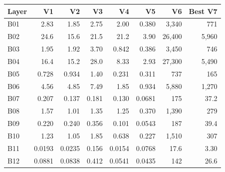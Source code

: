 \begin{tabular}{lrrrrrrr}
\hline
\rowcolor{headgrey}
\textbf{Layer} & \textbf{V1} & \textbf{V2} & \textbf{V3} & \textbf{V4} & \textbf{V5} & \textbf{V6} & \textbf{Best V7} \\ \hline
B01 & 2.83 & 1.85 & 2.75 & 2.00 & 0.380 & 3{,}340 & 771 \\
B02 & 24.6 & 15.6 & 21.5 & 21.2 & 3.90 & 26{,}400 & 5{,}960 \\
B03 & 1.95 & 1.92 & 3.70 & 0.842 & 0.386 & 3{,}450 & 746 \\
B04 & 16.4 & 15.2 & 28.0 & 8.33 & 2.93 & 27{,}300 & 5{,}490 \\
B05 & 0.728 & 0.934 & 1.40 & 0.231 & 0.311 & 737 & 165 \\
B06 & 4.56 & 4.85 & 7.49 & 1.85 & 0.934 & 5{,}880 & 1{,}270 \\
B07 & 0.207 & 0.137 & 0.181 & 0.130 & 0.0681 & 175 & 37.2 \\
B08 & 1.57 & 1.01 & 1.35 & 1.25 & 0.370 & 1{,}390 & 279 \\
B09 & 0.220 & 0.240 & 0.356 & 0.101 & 0.0543 & 187 & 39.4 \\
B10 & 1.23 & 1.05 & 1.85 & 0.638 & 0.227 & 1{,}510 & 307 \\
B11 & 0.0193 & 0.0235 & 0.156 & 0.0154 & 0.0768 & 17.6 & 3.30 \\
B12 & 0.0881 & 0.0838 & 0.412 & 0.0541 & 0.0435 & 142 & 26.6 \\
\hline
\end{tabular}
